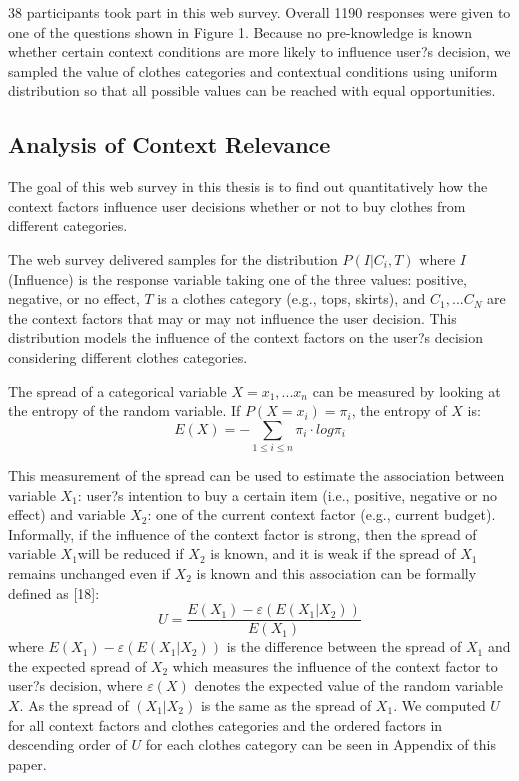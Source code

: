 38 participants took part in this web survey. Overall 1190 responses were given to one of the questions shown in Figure 1. Because no pre-knowledge is known whether certain context conditions are more likely to influence user?s decision, we sampled the value of clothes categories and contextual conditions using uniform distribution so that all possible values can be reached with equal opportunities.

\subsection{Analysis of Context Relevance} \label{sec:acr_acr}

The goal of this web survey in this thesis is to find out quantitatively how the context factors influence user decisions whether or not to buy clothes from different categories. 

The web survey delivered samples for the distribution $P(I|C_i,T)$ where $I$(Influence) is the response variable taking one of the three values: positive, negative, or no effect, $T$ is a clothes category (e.g., tops, skirts), and $C_1, ... C_N$ are the context factors that may or may not influence the user decision. This distribution models the influence of the context factors on the user?s decision considering different clothes categories. 

The spread of a categorical variable $X={x_1, ... x_n}$ can be measured by looking at the entropy of the random variable. If $P(X=x_i)=\pi_i$, the entropy of $X$ is: 
$$E(X)=-\sum_{1\leq i\leq n}\pi_i \cdot log{\pi_i} $$

This measurement of the spread can be used to estimate the association between variable $X_1$:  user?s intention to buy a certain item (i.e., positive, negative or no effect) and variable $X_2$: one of the current context factor (e.g., current budget). Informally, if the influence of the context factor is strong, then the spread of variable $X_1$will be reduced if $X_2$ is known, and it is weak if the spread of $X_1$ remains unchanged even if $X_2$ is known and this association can be formally defined as [18]:
$$U=\frac{E(X_1)-\varepsilon(E(X_1|X_2))}{E(X_1)}$$
where $E(X_1)-\varepsilon(E(X_1|X_2))$ is the difference between the spread of $X_1$ and the expected spread of $X_2$ which measures the influence of the context factor to user?s decision, where $\varepsilon(X)$ denotes the expected value of the random variable $X$. As the spread of $(X_1|X_2)$ is the same as the spread of $X_1$. We computed $U$ for all context factors and clothes categories and the ordered factors in descending order of $U$ for each clothes category can be seen in Appendix of this paper.

